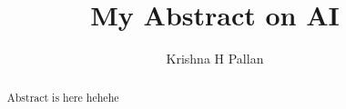 \documentclass{article}
\begin{document}
    \title{My Abstract on AI}
    \author{Krishna H Pallan}
    \maketitle
    \begin{abstract}
        Abstract is here hehehe
    \end{abstract}
\end{document}
